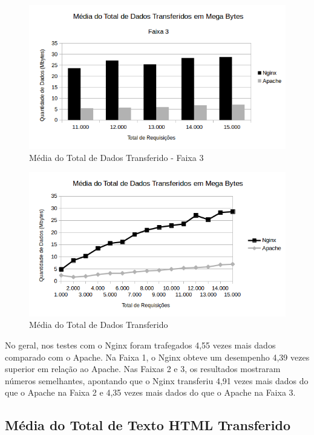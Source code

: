 \begin{figure}[H]
	\centering
	\includegraphics[width=1\linewidth]{graficos/grafico2-f3} 
	\caption{Média do Total de Dados Transferido - Faixa 3}
	\label{fig:grafico2-f3}
\end{figure}

\begin{figure}[H]
	\centering
	\includegraphics[width=1\linewidth]{graficos/grafico2} 
	\caption{Média do Total de Dados Transferido}
	\label{fig:grafico2}
\end{figure}

No geral, nos testes com o Nginx foram trafegados 4,55 vezes mais dados 
comparado com o Apache. Na Faixa 1, o Nginx obteve um desempenho 4,39 vezes 
superior em relação ao Apache. Nas Faixas 2 e 3, os resultados mostraram 
números semelhantes, apontando que o Nginx transferiu 4,91 vezes mais dados do 
que o Apache na Faixa 2 e 4,35 vezes mais dados do que o Apache na Faixa 3.

\subsection{Média do Total de Texto HTML Transferido}

